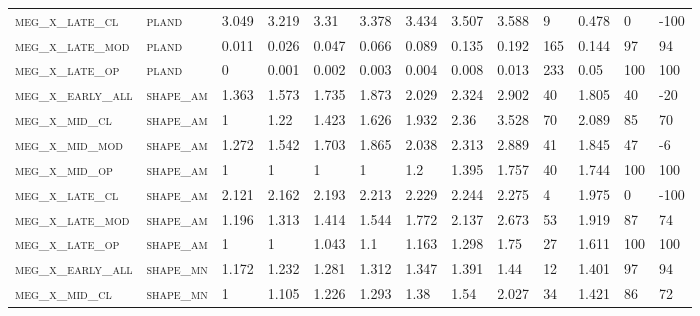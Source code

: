 \begin{landscape}
\begin{center}
\begin{footnotesize}
\begin{longtable}{lllllllllllll}
\textsc{meg\_x\_late\_cl  } & \textsc{pland     }   & 3.049    & 3.219    & 3.31     & 3.378    & 3.434    & 3.507    & 3.588     & 9      & 0.478         & 0             & -100          \\
\textsc{meg\_x\_late\_mod } & \textsc{pland     }   & 0.011    & 0.026    & 0.047    & 0.066    & 0.089    & 0.135    & 0.192     & 165    & 0.144         & 97            & 94            \\
\textsc{meg\_x\_late\_op  } & \textsc{pland     }   & 0        & 0.001    & 0.002    & 0.003    & 0.004    & 0.008    & 0.013     & 233    & 0.05          & 100           & 100           \\
\textsc{meg\_x\_early\_all} & \textsc{shape\_am }   & 1.363    & 1.573    & 1.735    & 1.873    & 2.029    & 2.324    & 2.902     & 40     & 1.805         & 40            & -20           \\
\textsc{meg\_x\_mid\_cl   } & \textsc{shape\_am }   & 1        & 1.22     & 1.423    & 1.626    & 1.932    & 2.36     & 3.528     & 70     & 2.089         & 85            & 70            \\
\textsc{meg\_x\_mid\_mod  } & \textsc{shape\_am }   & 1.272    & 1.542    & 1.703    & 1.865    & 2.038    & 2.313    & 2.889     & 41     & 1.845         & 47            & -6            \\
\textsc{meg\_x\_mid\_op   } & \textsc{shape\_am }   & 1        & 1        & 1        & 1        & 1.2      & 1.395    & 1.757     & 40     & 1.744         & 100           & 100           \\
\textsc{meg\_x\_late\_cl  } & \textsc{shape\_am }   & 2.121    & 2.162    & 2.193    & 2.213    & 2.229    & 2.244    & 2.275     & 4      & 1.975         & 0             & -100          \\
\textsc{meg\_x\_late\_mod } & \textsc{shape\_am }   & 1.196    & 1.313    & 1.414    & 1.544    & 1.772    & 2.137    & 2.673     & 53     & 1.919         & 87            & 74            \\
\textsc{meg\_x\_late\_op  } & \textsc{shape\_am }   & 1        & 1        & 1.043    & 1.1      & 1.163    & 1.298    & 1.75      & 27     & 1.611         & 100           & 100           \\
\textsc{meg\_x\_early\_all} & \textsc{shape\_mn }   & 1.172    & 1.232    & 1.281    & 1.312    & 1.347    & 1.391    & 1.44      & 12     & 1.401         & 97            & 94            \\
\textsc{meg\_x\_mid\_cl   } & \textsc{shape\_mn }   & 1        & 1.105    & 1.226    & 1.293    & 1.38     & 1.54     & 2.027     & 34     & 1.421         & 86            & 72            \\

\end{longtable}
\end{footnotesize}
\end{center}
\end{landscape}
